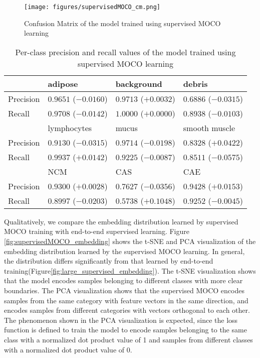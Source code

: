 \documentclass[12pt,twoside]{report}
\begin{document}
\begin{figure}
    \centering
    \texttt{[image: figures/supervisedMOCO\_cm.png]}
    \caption{Confusion Matrix of the model trained using supervised MOCO learning}
    \label{fig:supervisedMOCO_cm}
\end{figure}

\begin{table}[]
    \centering
    \begin{tabular}{llll}
\toprule
 & adipose & background & debris \\
\hline
Precision & $0.9651$ ($-0.0160$) & $0.9713$ ($+0.0032$) & $0.6886$ ($-0.0315$) \\
Recall & $0.9708$ ($-0.0142$) & $1.0000$ ($+0.0000$) & $0.8938$ ($-0.0103$) \\
\toprule
 & lymphocytes & mucus & smooth muscle \\
\hline
Precision & $0.9130$ ($-0.0315$) & $0.9714$ ($-0.0198$) & $0.8328$ ($+0.0422$) \\
Recall & $0.9937$ ($+0.0142$) & $0.9225$ ($-0.0087$) & $0.8511$ ($-0.0575$) \\
\toprule
 & NCM & CAS & CAE \\
\hline
Precision & $0.9300$ ($+0.0028$) & $0.7627$ ($-0.0356$) & $0.9428$ ($+0.0153$) \\
Recall & $0.8997$ ($-0.0203$) & $0.5738$ ($+0.1048$) & $0.9252$ ($-0.0045$) \\
    \bottomrule
    \end{tabular}
    \caption{Per-class precision and recall values of the model trained using supervised MOCO learning}
    \label{tab:supervisedMOCO_preci_recall}
\end{table}


Qualitatively, we compare the embedding distribution learned by supervised MOCO training with end-to-end supervised learning. Figure \ref{fig:supervisedMOCO_embedding} shows the t-SNE and PCA visualization of the embedding distribution learned by the supervised MOCO learning. In general, the distribution differs significantly from that learned by end-to-end training(Figure\ref{fig:large_supervised_embedding}). The t-SNE visualization shows that the model encodes samples belonging to different classes with more clear boundaries. The PCA visualization shows that the supervised MOCO encodes samples from the same category with feature vectors in the same direction, and encodes samples from different categories with vectors orthogonal to each other. The phenomenon shown in the PCA visualization is expected, since the loss function is defined to train the model to encode samples belonging to the same class with a normalized dot product value of 1 and samples from different classes with a normalized dot product value of 0. \\
\end{document}
